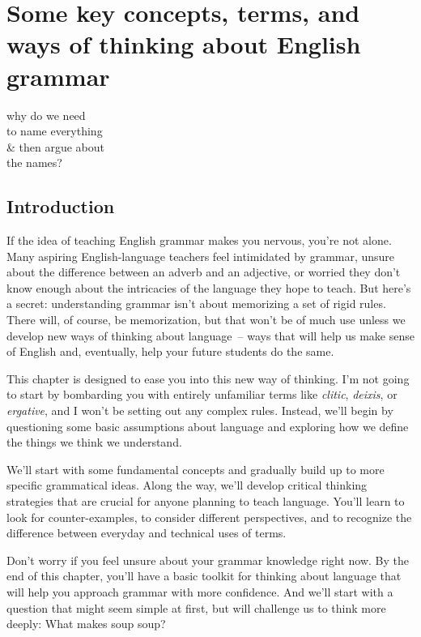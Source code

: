 \chapter{Some key concepts, terms, and ways of thinking about English grammar}\label{ch:1}


\epigraph{why do we need\\
to name everything\\
\& then argue about\\
the names?}{}


\section{Introduction}\label{sec:intro1}

If the idea of teaching English grammar makes you nervous, you're not alone. Many aspiring English-language teachers feel intimidated by grammar, unsure about the difference between an adverb and an adjective, or worried they don't know enough about the intricacies of the language they hope to teach. But here's a secret: understanding grammar isn't about memorizing a set of rigid rules. There will, of course, be memorization, but that won't be of much use unless we develop new ways of thinking about language~-- ways that will help us make sense of English and, eventually, help your future students do the same.

This chapter is designed to ease you into this new way of thinking. I'm not going to start by bombarding you with entirely unfamiliar terms like \textit{clitic}, \textit{deixis}, or \textit{ergative}, and I won't be setting out any complex rules. Instead, we'll begin by questioning some basic assumptions about language and exploring how we define the things we think we understand.

We'll start with some fundamental concepts and gradually build up to more specific grammatical ideas. Along the way, we'll develop critical thinking strategies that are crucial for anyone planning to teach language. You'll learn to look for counter-examples, to consider different perspectives, and to recognize the difference between everyday and technical uses of terms.

Don't worry if you feel unsure about your grammar knowledge right now. By the end of this chapter, you'll have a basic toolkit for thinking about language that will help you approach grammar with more confidence. And we'll start with a question that might seem simple at first, but will challenge us to think more deeply: What makes soup soup?


